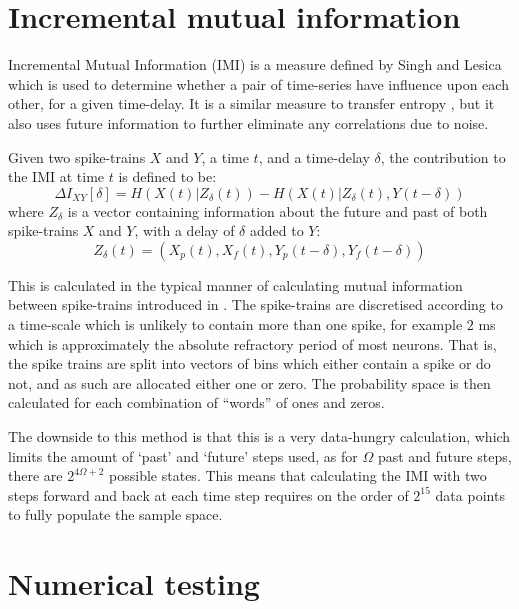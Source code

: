 \section{Incremental mutual information}
Incremental Mutual Information (IMI) is a measure defined by Singh and Lesica \citep{SinghLesica2010a} which is used to determine whether a pair of time-series have influence upon each other, for a given time-delay.  It is a similar measure to transfer entropy \citep{Schreiber2000a}, but it also uses future information to further eliminate any correlations due to noise.

Given two spike-trains $X$ and $Y$, a time $t$, and a time-delay $\delta$, the contribution to the IMI at time $t$ is defined to be:
\begin{equation}
\Delta I_{XY}[\delta] = H\left(X(t) | Z_{\delta}(t)\right) - H\left(X(t) | Z_{\delta}(t),Y(t-\delta)\right)
\end{equation}
where $Z_{\delta}$ is a vector containing information about the future and past of both spike-trains $X$ and $Y$, with a delay of $\delta$ added to $Y$:
\begin{equation}
Z_{\delta}(t) =  \left(X_p(t),X_f(t),Y_p(t-\delta), Y_f(t-\delta)\right)
\end{equation}

This is calculated in the typical manner of calculating mutual information between spike-trains introduced in \citep{BialekEtAl1998a}.  The spike-trains are discretised according to a time-scale which is unlikely to contain more than one spike, for example $2$ ms which is approximately the absolute refractory period of most neurons. That is, the spike trains are split into vectors of bins which either contain a spike or do not, and as such are allocated either one or zero.  The probability space is then calculated for each combination of ``words'' of ones and zeros.

The downside to this method is that this is a very data-hungry calculation, which limits the amount of `past' and `future' steps used, as for $\Omega$ past and future steps, there are $2^{4\Omega+2}$ possible states. This means that calculating the IMI with two steps forward and back at each time step requires on the order of $2^{15}$ data points to fully populate the sample space.

\section{Numerical testing}

